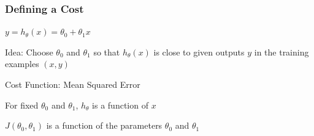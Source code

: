 \documentclass[xcolor=pdftex,dvipsnames]{beamer}
\begin{document}
\begin{frame}
  \frametitle{Defining a Cost}
  \begin{block}{}
    \begin{center}
      $y = h_{\theta}(x) = \theta_0 + \theta_1 x$
    \end{center}
  \end{block}
  \begin{block}{}
    Idea: Choose $\theta_0$ and $\theta_1$ so that $h_{\theta}(x)$ is close to given outputs $y$ in the training examples $(x,y)$  
  \end{block}
  \pause
  \begin{block}{Cost Function: Mean Squared Error}
  \end{block}
  \pause \pause \pause
  \begin{minipage}{0.47\linewidth}
    \begin{block}{}
      For fixed $\theta_0$ and $\theta_1$, $h_{\theta}$ is a function of $x$
     \end{block}
   \end{minipage}\hfill
  \pause
  \begin{minipage}{0.47\linewidth}
    \begin{block}{}
      $J(\theta_0, \theta_1)$ is a function of the parameters $\theta_0$ and $\theta_1$
    \end{block}
  \end{minipage}
\end{frame}
  
\end{document}
